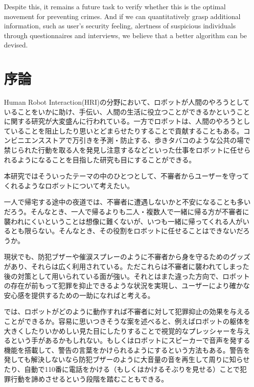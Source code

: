 \documentclass{kuisthesis}
\begin{document}
\begin{eabstract}
Despite this, it remains a future task to verify whether this is the optimal movement for preventing crimes. And if we can quantitatively grasp additional information, such as user's security feeling, alertness of suspicious individuals through questionnaires and interviews, we believe that a better algorithm can be devised.
\end{eabstract}

\tableofcontents






\section{序論}

Human Robot Interaction(HRI)の分野において、ロボットが人間のやろうとしていることをいかに助け、手伝い、人間の生活に役立つことができるかということに関する研究が大変盛んに行われている。一方でロボットは、人間のやろうとしていることを阻止したり思いとどまらせたりすることで貢献することもある。コンビニエンスストアで万引きを予測・防止する、歩きタバコのような公共の場で禁じられた行動を取る人を発見し注意するなどといった仕事をロボットに任せられるようになることを目指した研究も目にすることができる。

本研究ではそういったテーマの中のひとつとして、不審者からユーザーを守ってくれるようなロボットについて考えたい。

一人で帰宅する途中の夜道では、不審者に遭遇しないかと不安になることも多いだろう。そんなとき、一人で帰るよりも二人・複数人で一緒に帰る方が不審者に襲われにくいということは想像に難くないが、いつも一緒に帰ってくれる人がいるとも限らない。そんなとき、その役割をロボットに任せることはできないだろうか。

現状でも、防犯ブザーや催涙スプレーのように不審者から身を守るためのグッズがあり、それらは広く利用されている。ただこれらは不審者に襲われてしまった後の対策として用いられている面が強い。それとはまた違った方向で、ロボットの存在が前もって犯罪を抑止できるような状況を実現し、ユーザーにより確かな安心感を提供するための一助になればと考える。

では、ロボットがどのように動作すれば不審者に対して犯罪抑止の効果を与えることができるか。容易に思いつきそうな案を述べると、例えばロボットの躯体を大きくしたりいかめしい見た目にしたりすることで視覚的なプレッシャーを与えるという手があるかもしれない。もしくはロボットにスピーカーで音声を発する機能を搭載して、警告の言葉をかけられるようにするという方法もある。警告を発しても解決しないなら防犯ブザーのように大音量の音を再生して周りに知らせたり、自動で110番に電話をかける（もしくはかけるそぶりを見せる）ことで犯罪行動を諦めさせるという段階を踏むこともできる。
\end{document}
